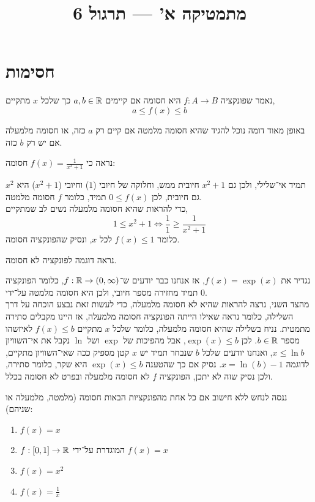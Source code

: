
\setcounter{secnumdepth}{2}

\usepackage{pgfplots}
\pgfplotsset{compat=1.18}

\title{מתמטיקה א' --- תרגול 6}
\date{}



\maketitle

\section{חסימות}
\begin{definition}
	נאמר שפונקציה $f : A \to B$ היא חסומה אם קיימים $a, b \in \mathbb{R}$ כך שלכל $x$ מתקיים,
	\[
		a \le f(x) \le b
	\]
\end{definition}
באופן מאוד דומה נוכל להגיד שהיא חסומה מלמטה אם קיים רק $a$ כזה, או חסומה מלמעלה אם יש רק $b$ כזה.
\begin{example}
	נראה כי $f(x) = \frac{1}{x^2 + 1}$ חסומה:

	$x^2$ תמיד אי־שלילי, ולכן גם $x^2 + 1$ חיובית ממש, וחלוקה של חיובי ($1$) וחיובי ($x^2 + 1$) היא גם חיובית, לכן $0 \le f(x)$ תמיד, כלומר $f$ חסומה מלמטה. \\
	כדי להראות שהיא חסומה מלמעלה נשים לב שמתקיים,
	\[
		1 \le x^2 + 1
		\iff \frac{1}{1} \ge \frac{1}{x^2 + 1}
	\]
	כלומר $f(x) \le 1$ לכל $x$, ונסיק שהפונקציה חסומה.
\end{example}
נראה דוגמה לפונקציה לא חסומה.
\begin{example}
	נגדיר את $f(x) = \exp(x)$, אז אנחנו כבר יודעים ש־$f : \mathbb{R} \to (0, \infty)$, כלומר הפונקציה תמיד מחזירה מספר חיובי, ולכן היא חסומה מלמטה על־ידי $0$. \\
	מהצד השני, נרצה להראות שהיא לא חסומה מלמעלה, כדי לעשות זאת נבצע הוכחה על דרך השלילה, כלומר נראה שאילו הייתה הפונקציה חסומה מלמעלה, אז היינו מקבלים סתירה מתמטית.
	נניח בשלילה שהיא חסומה מלמעלה, כלומר שלכל $x$ מתקיים $f(x) \le b$ לאיזשהו מספר $b \in \mathbb{R}$.
	לכן $\exp(x) \le b$, אבל מהפיכות של $\exp$ ושל $\ln$ נקבל את אי־השוויון $x \le \ln b$, ואנחנו יודעים שלכל $b$ שנבחר תמיד יש $x$ קטן מספיק ככה שאי־השוויון מתקיים, לדוגמה $x = \ln(b) - 1$.
	נסיק אם כך שהטענה $\exp(x) \le b$ היא שקר, כלומר סתירה, ולכן נסיק שזה לא יתכן, הפונקציה $f$ לא חסומה מלמעלה ובפרט לא חסומה בכלל.
\end{example}
\begin{exercise}
	ננסה לנחש ללא חישוב אם כל אחת מהפונקציות הבאות חסומה (מלמטה, מלמעלה או שניהם):
	\begin{enumerate}
		\item $f(x) = x$
		\item $f : [0, 1] \to \mathbb{R}$ המוגדרת על־ידי $f(x) = x$
		\item $f(x) = x^2$
		\item $f(x) = \frac{1}{x}$
	\end{enumerate}
\end{exercise}
